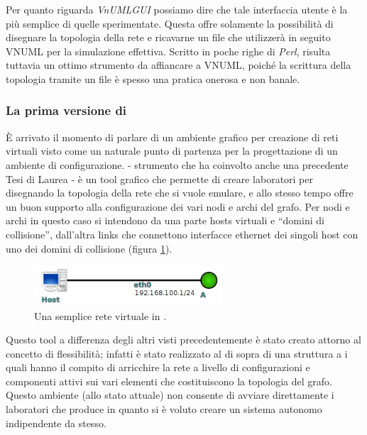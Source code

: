 Per quanto riguarda \emph{VnUMLGUI} possiamo dire che tale interfaccia utente è la più semplice di quelle sperimentate. Questa offre solamente la possibilità di disegnare la topologia della rete e ricavarne un file \xml che utilizzerà in seguito VNUML per la simulazione effettiva. Scritto in poche righe di \emph{Perl}, risulta tuttavia un ottimo strumento da affiancare a VNUML, poiché la scrittura della topologia tramite un file \xml è spesso una pratica onerosa e non banale.

\subsubsection{La prima versione di \visualnetkit{}}
È arrivato il momento di parlare di un ambiente grafico per creazione di reti virtuali visto come un naturale punto
di partenza per la progettazione di un ambiente di configurazione. \visualnetkit{} - strumento che ha coinvolto anche una precedente Tesi di Laurea - è un tool grafico che permette di creare laboratori per \netkit{} disegnando la topologia della rete che si vuole emulare, e allo stesso tempo offre un buon supporto alla configurazione dei vari nodi e archi del grafo. Per nodi e archi in questo caso si intendono da una parte hosts virtuali e ``domini di collisione'', dall'altra links che connettono interfacce ethernet dei singoli host con uno dei domini di collisione (figura \ref{figura:vn_graph_1}).

\begin{figure}[!ht]
	\centering
	\includegraphics[width=7cm]{images/visualnetkit_graph_1.png}
	\caption{Una semplice rete virtuale in \visualnetkit{}.}
	\label{figura:vn_graph_1}
\end{figure}

Questo tool a differenza degli altri visti precedentemente è stato creato attorno al concetto di flessibilità; infatti \visualnetkit{} è stato realizzato al di sopra di una struttura a \plugin{} i quali hanno il compito di arricchire la rete a livello di configurazioni e componenti attivi sui vari elementi che costituiscono la topologia del grafo. Questo ambiente (allo stato attuale) non consente di avviare direttamente i laboratori che produce in quanto si è voluto creare un sistema autonomo indipendente da \netkit{} stesso.

